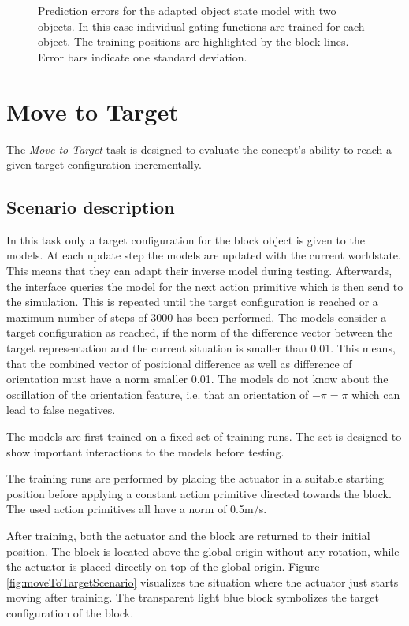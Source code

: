 \begin{figure}
\centering
\caption{Prediction errors for the adapted object state model with two objects. In this case individual gating functions are trained for each object. The training positions are highlighted by the block lines. Error bars indicate one standard deviation.}
\label{fig:eachPosTwoObjects2Gates}
\end{figure}

\section{Move to Target \label{sec:moveToTarget}}

The \textit{Move to Target} task is designed to evaluate the concept's ability to reach a given target configuration incrementally. 

\subsection{Scenario description}

In this task only a target configuration for the block object is given to the models. At each update step the models are updated with the current worldstate.
This means that they can adapt their inverse model during testing.
Afterwards, the interface queries the model for the next action primitive which is then send to the simulation. This is repeated until the target configuration is reached or a maximum number of steps of 3000 has been performed.
The models consider a target configuration as reached, if the norm of the difference vector between the target representation and the current situation is smaller than 0.01. This means, that the combined vector of positional difference as well as difference of orientation must have a norm smaller 0.01. The models do not know about the oscillation of the orientation feature, i.e. that an orientation of $-\pi = \pi$ which can lead to false negatives.

The models are first trained on a fixed set of training runs. The set is designed to show important interactions to the models before testing.

The training runs are performed by placing the actuator in a suitable starting position before applying a constant action primitive directed towards the block.
The used action primitives all have a norm of 0.5m/s.

After training, both the actuator and the block are returned to their initial position. The block is located  above the global origin without any rotation, while the actuator is placed directly on top of the global origin.
Figure \ref{fig:moveToTargetScenario} visualizes the situation where the actuator just starts moving after training. The transparent light blue block symbolizes the target configuration of the block.

